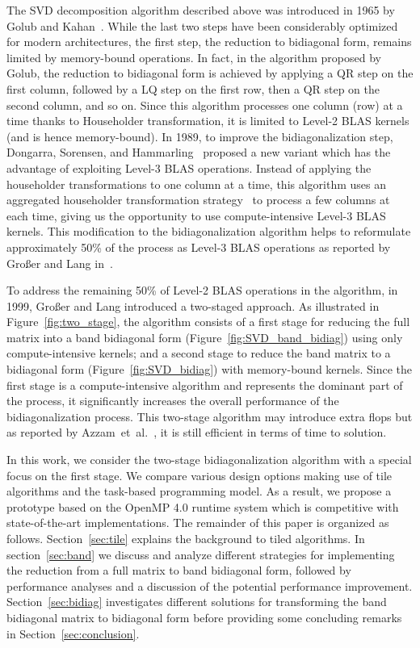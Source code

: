 The SVD decomposition algorithm described above was introduced in
1965 by Golub and Kahan~\cite{golub1965calculating}.
While the last two steps have been considerably optimized
for modern architectures,
the first step, the reduction to bidiagonal form, remains limited by
memory-bound operations. In fact, in the algorithm proposed by Golub,
the reduction to bidiagonal form is achieved by applying a QR step on
the first column, followed by a LQ step on the first row, then a QR
step on the second column, and so on. Since this algorithm processes
one column (row) at a time thanks to Householder transformation, it is
limited to Level-2 BLAS kernels (and is hence memory-bound).
In 1989, to improve the bidiagonalization step,
Dongarra, Sorensen, and Hammarling~\cite{dongarra1989block}
proposed a new variant which has the advantage of exploiting
Level-3 BLAS operations.
Instead of applying the householder transformations to
one column at a time,
this algorithm uses an aggregated householder transformation
strategy~\cite{bischof1987wy} to process a few columns at each time,
giving us the opportunity to use compute-intensive Level-3 BLAS kernels.
This modification to the bidiagonalization algorithm helps
to reformulate approximately  50\% of the process as Level-3 BLAS operations
as reported by Gro{\ss}er and Lang in~\cite{grosser1999efficient}.

To address the remaining 50\% of Level-2 BLAS operations in the
algorithm, in 1999, Gro{\ss}er and Lang introduced a two-staged
approach.
As illustrated in Figure~\ref{fig:two_stage}, the algorithm consists of
a first stage for reducing the full matrix into a
band bidiagonal form (Figure~\ref{fig:SVD_band_bidiag}) using only
compute-intensive kernels; and a second stage to reduce the band
matrix to a bidiagonal form (Figure~\ref{fig:SVD_bidiag}) with
memory-bound kernels. Since the first stage is a compute-intensive
algorithm and represents the dominant part of the process,
it significantly increases the overall performance of the
bidiagonalization process.
This two-stage algorithm may introduce extra flops
but as reported by Azzam~et~al\@.~\cite{haidar2013improved},
it is still efficient in terms of time to solution.

In this work, we consider the two-stage bidiagonalization algorithm
with a special focus on the first stage.
We compare various design options making use of tile algorithms and
the task-based programming model.
As a result,
we propose a prototype based on the OpenMP 4.0 runtime system which is
competitive with state-of-the-art implementations.
The remainder of this paper is organized as follows.
Section~\ref{sec:tile} explains the background to tiled algorithms.
In section~\ref{sec:band} we discuss and analyze
different strategies for implementing the
reduction from a full matrix to band bidiagonal form,
followed by performance analyses and a discussion of
the potential performance improvement.
Section~\ref{sec:bidiag} investigates different solutions
for transforming the band bidiagonal matrix
to bidiagonal form before providing some concluding
remarks in Section~\ref{sec:conclusion}.

